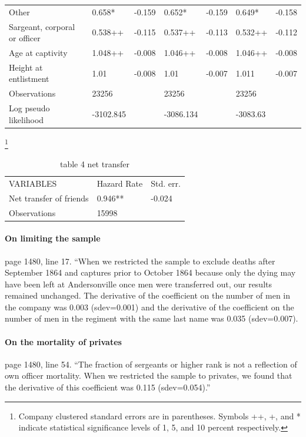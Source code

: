 \documentclass[draft.tex]{subfiles}
\begin{document}
\begin{table}
\begin{tabular}{lllllll}
Other                                    & 0.658*      & -0.159    & 0.652*      & -0.159    & 0.649*      & -0.158    \\
Sargeant, corporal or officer            & 0.538++     & -0.115    & 0.537++     & -0.113    & 0.532++     & -0.112    \\
Age at captivity                         & 1.048++     & -0.008    & 1.046++     & -0.008    & 1.046++     & -0.008    \\
Height at entlistment                    & 1.01        & -0.008    & 1.01        & -0.007    & 1.011       & -0.007    \\
Observations                             & 23256       &           & 23256       &           & 23256       &           \\
Log pseudo likelihood                    & -3102.845   &           & -3086.134   &           & -3083.63    &           \\
\end{tabular}
\end{table}

\begin{table}[ht]
\centering
\caption{table 4 net transfer}\footnote{Company clustered standard errors are in parentheses. Symbols ++, +, and * indicate statistical significance levels of 1, 5, and 10 percent respectively.}
\begin{tabular}{lll}
\hline
VARIABLES               & Hazard Rate & Std. err. \\
Net transfer of friends & 0.946**     & -0.024    \\
Observations            & 15998       &           \\
\end{tabular}
\end{table}

\paragraph{On limiting the sample}
page 1480, line 17. ``When we restricted the sample to exclude deaths after September 1864 and captures prior to October 1864 because only the dying may have been left at Andersonville once men were transferred out, our results remained unchanged. The derivative of the coefficient on the number of men in the company was 0.003 (sdev=0.001) and the derivative of the coefficient on the number of men in the regiment with the same last name was 0.035 (sdev=0.007).

\paragraph{On the mortality of privates}
page 1480, line 54. ``The fraction of sergeants or higher rank is not a reflection of own officer mortality. When we restricted the sample to privates, we found that the derivative of this coefficient was 0.115 (sdev=0.054).''
\end{document}
